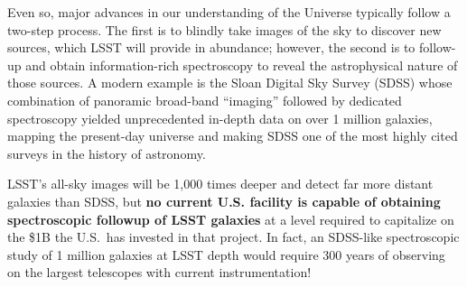 \documentclass[oneside,11pt]{amsart}
\begin{document}


Even so, major advances in our understanding of the Universe typically
follow a two-step process.  The first is to blindly take images of the
sky to discover new sources, which LSST will provide in abundance;
however, the second is to follow-up and obtain information-rich
spectroscopy to reveal the astrophysical nature of those sources.  A
modern example is the Sloan Digital Sky Survey (SDSS) whose combination
of panoramic broad-band ``imaging'' followed by dedicated spectroscopy
yielded unprecedented in-depth data on over 1 million galaxies, mapping
the present-day universe and making SDSS one of the most highly cited
surveys in the history of astronomy.


LSST's all-sky images will be 1,000 times deeper and detect far more
distant galaxies than SDSS, but \textbf{no current U.S. facility is
capable of obtaining spectroscopic followup of LSST galaxies} at a level
required to capitalize on the \$1B the U.S.\ has invested in that
project.  In fact, an SDSS-like spectroscopic study of 1 million
galaxies at LSST depth would require 300 years of observing on the
largest telescopes with current instrumentation!  
\end{document}

